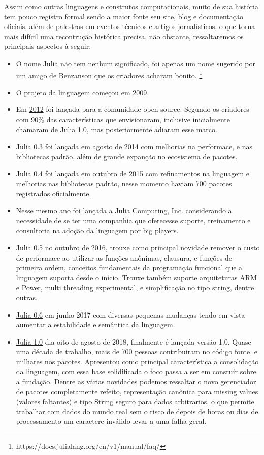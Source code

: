 Assim como outras linguagens e construtos computacionais, muito de sua história tem pouco registro formal sendo a maior fonte seu site, blog e documentação oficiais, além de palestras em eventos técnicos e artigos jornalísticos, o que torna mais difícil uma recontrução histórica precisa, não obstante, ressaltaremos os principais aspectos à seguir: 
\begin{itemize}
   \item O nome Julia não tem nenhum significado, foi apenas um nome sugerido por um amigo de Benzanson que os criadores acharam bonito. \footnote{https://docs.julialang.org/en/v1/manual/faq/}
   \item O projeto da linguagem começou em 2009.
   \item Em \href{https://julialang.org/blog/2012/02/why-we-created-julia/}{2012} foi lançada para a comunidade open source. Segundo os criadores com 90\% das características que envisionaram, inclusive inicialmente chamaram de Julia 1.0, mas posteriormente adiaram esse marco. 
   \item \href{https://julialang.org/blog/2014/08/julia-0.3-release/}{Julia 0.3} foi lançada em agosto de 2014 com melhorias na performace, e nas bibliotecas padrão, além de grande expanção no ecosistema de pacotes. 
   \item \href{https://julialang.org/blog/2015/10/julia-0.4-release/}{Julia 0.4} foi lançada em outubro de 2015 com refinamentos na linguagem e melhorias nas bibliotecas padrão, nesse momento haviam 700 pacotes registrados oficialmente.
   \item Nesse mesmo ano foi lançada a Julia Computing, Inc. considerando a necessidade de se ter uma companhia que oferecesse suporte, treinamento e consultoria na adoção da linguagem por big players. 
   \item \href{https://julialang.org/blog/2016/10/julia-0.5-release/}{Julia 0.5} no outubro de 2016, trouxe como principal novidade remover o custo de performace ao utilizar as funções anônimas, clausura, e funções de primeira ordem, conceitos fundamentais da programação funcional que a linguagem suporta desde o início. Trouxe também suporte arquiteturas ARM e Power, multi threading experimental, e simplificação no tipo string, dentre outras. 
   \item \href{https://julialang.org/blog/2017/06/julia-0.6-release/}{Julia 0.6} em junho 2017 com diversas pequenas mudanças tendo em vista aumentar a estabilidade e semântica da linguagem. 
   \item \href{https://julialang.org/blog/2018/08/one-point-zero/}{Julia 1.0}  dia oito de agosto de 2018, finalmente é lançada versão 1.0. Quase uma década de trabalho, mais de 700 pessoas contribuiram no código fonte, e milhares nos pacotes. Apresentou como principal característica a consolidação da linguagem, com essa base solidificada o foco passa a ser em consruir sobre a fundação. Dentre as várias novidades podemos ressaltar o novo gerenciador de pacotes completamente refeito, representação canônica para missing values (valores faltantes) e tipo String seguro para dados arbitrarios, o que permite trabalhar com dados do mundo real sem o risco de depois de horas ou dias de processamento um caractere inválido levar a uma falha geral. 

\end{itemize}
